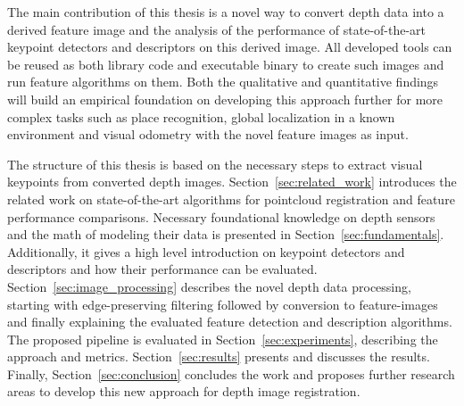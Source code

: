 The main contribution of this thesis is a novel way to convert depth data into a derived feature image and the analysis of the performance of state-of-the-art keypoint detectors and descriptors on this derived image.
All developed tools can be reused as both library code and executable binary to create such images and run feature algorithms on them.
Both the qualitative and quantitative findings will build an empirical foundation on developing this approach further for more complex tasks such as place recognition, global localization in a known environment and visual odometry with the novel feature images as input.

The structure of this thesis is based on the necessary steps to extract visual keypoints from converted depth images.
Section~\ref{sec:related_work} introduces the related work on state-of-the-art algorithms for pointcloud registration and feature performance comparisons.
Necessary foundational knowledge on depth sensors and the math of modeling their data is presented in Section~\ref{sec:fundamentals}.
Additionally, it gives a high level introduction on keypoint detectors and descriptors and how their performance can be evaluated.
Section~\ref{sec:image_processing} describes the novel depth data processing, starting with edge-preserving filtering followed by conversion to feature-images and finally explaining the evaluated feature detection and description algorithms.
The proposed pipeline is evaluated in Section~\ref{sec:experiments}, describing the approach and metrics.
Section~\ref{sec:results} presents and discusses the results.
Finally, Section~\ref{sec:conclusion} concludes the work and proposes further research areas to develop this new approach for depth image registration.
